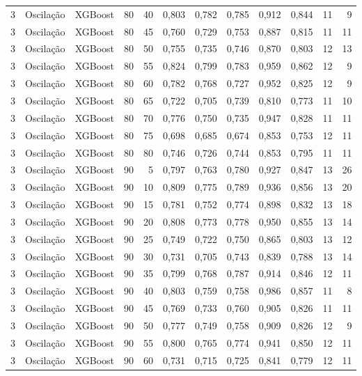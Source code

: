 \begin{longtable}{ccclrrrrrrrr}
3 & Oscilação & XGBoost & 80 & 40 & 0,803 & 0,782 & 0,785 & 0,912 & 0,844 & 11 & 9 \\
3 & Oscilação & XGBoost & 80 & 45 & 0,760 & 0,729 & 0,753 & 0,887 & 0,815 & 11 & 11 \\
3 & Oscilação & XGBoost & 80 & 50 & 0,755 & 0,735 & 0,746 & 0,870 & 0,803 & 12 & 13 \\
3 & Oscilação & XGBoost & 80 & 55 & 0,824 & 0,799 & 0,783 & 0,959 & 0,862 & 12 & 9 \\
3 & Oscilação & XGBoost & 80 & 60 & 0,782 & 0,768 & 0,727 & 0,952 & 0,825 & 12 & 9 \\
3 & Oscilação & XGBoost & 80 & 65 & 0,722 & 0,705 & 0,739 & 0,810 & 0,773 & 11 & 10 \\
3 & Oscilação & XGBoost & 80 & 70 & 0,776 & 0,750 & 0,735 & 0,947 & 0,828 & 11 & 11 \\
3 & Oscilação & XGBoost & 80 & 75 & 0,698 & 0,685 & 0,674 & 0,853 & 0,753 & 12 & 11 \\
3 & Oscilação & XGBoost & 80 & 80 & 0,746 & 0,726 & 0,744 & 0,853 & 0,795 & 11 & 11 \\
3 & Oscilação & XGBoost & 90 & 5 & 0,797 & 0,763 & 0,780 & 0,927 & 0,847 & 13 & 26 \\
3 & Oscilação & XGBoost & 90 & 10 & 0,809 & 0,775 & 0,789 & 0,936 & 0,856 & 13 & 20 \\
3 & Oscilação & XGBoost & 90 & 15 & 0,781 & 0,752 & 0,774 & 0,898 & 0,832 & 13 & 18 \\
3 & Oscilação & XGBoost & 90 & 20 & 0,808 & 0,773 & 0,778 & 0,950 & 0,855 & 13 & 14 \\
3 & Oscilação & XGBoost & 90 & 25 & 0,749 & 0,722 & 0,750 & 0,865 & 0,803 & 13 & 12 \\
3 & Oscilação & XGBoost & 90 & 30 & 0,731 & 0,705 & 0,743 & 0,839 & 0,788 & 13 & 14 \\
3 & Oscilação & XGBoost & 90 & 35 & 0,799 & 0,768 & 0,787 & 0,914 & 0,846 & 12 & 11 \\
3 & Oscilação & XGBoost & 90 & 40 & 0,803 & 0,759 & 0,758 & 0,986 & 0,857 & 11 & 8 \\
3 & Oscilação & XGBoost & 90 & 45 & 0,769 & 0,733 & 0,760 & 0,905 & 0,826 & 11 & 11 \\
3 & Oscilação & XGBoost & 90 & 50 & 0,777 & 0,749 & 0,758 & 0,909 & 0,826 & 12 & 9 \\
3 & Oscilação & XGBoost & 90 & 55 & 0,800 & 0,765 & 0,774 & 0,941 & 0,850 & 12 & 11 \\
3 & Oscilação & XGBoost & 90 & 60 & 0,731 & 0,715 & 0,725 & 0,841 & 0,779 & 12 & 11 \\

\end{longtable}
